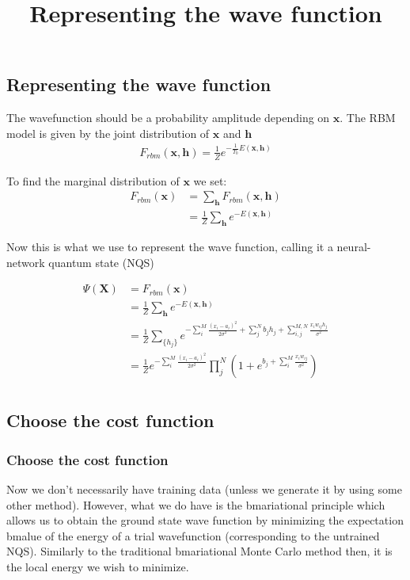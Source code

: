 \documentclass[norsk,a4paper,11pt]{beamer}
\begin{document}
\subsection{Representing the wave function}
\begin{frame}
\title{Representing the wave function}
The wavefunction should be a probability amplitude depending on $\bm{x}$. The RBM model is given by the joint distribution of $\bm{x}$ and $\bm{h}$
\begin{align}
	F_{rbm}(\bm{x},\mathbf{h}) = \frac{1}{Z} e^{-\frac{1}{T_0}E(\bm{x},\mathbf{h})}
\end{align}

To find the marginal distribution of $\bm{x}$ we set:
\begin{align}
	F_{rbm}(\mathbf{x}) &= \sum_\mathbf{h} F_{rbm}(\mathbf{x}, \mathbf{h}) \\
				&= \frac{1}{Z}\sum_\mathbf{h} e^{-E(\mathbf{x}, \mathbf{h})}
\end{align}
\end{frame}

\begin{frame}
Now this is what we use to represent the wave function, calling it a neural-network quantum state (NQS)

\begin{align}
	\Psi (\mathbf{X}) &= F_{rbm}(\mathbf{x}) \\
	&= \frac{1}{Z}\sum_{\bm{h}} e^{-E(\mathbf{x}, \mathbf{h})} \\
	&= \frac{1}{Z} \sum_{\{h_j\}} e^{-\sum_i^M \frac{(x_i - a_i)^2}{2\sigma^2} + \sum_j^N b_j h_j + \sum_{i,j}^{M,N} \frac{x_i w_{ij} h_j}{\sigma^2}} \\
	&= \frac{1}{Z} e^{-\sum_i^M \frac{(x_i - a_i)^2}{2\sigma^2}} \prod_j^N (1 + e^{b_j + \sum_i^M \frac{x_i w_{ij}}{\sigma^2}}) \\
\end{align}
\end{frame}

\subsection{Choose the cost function}
\begin{frame}
\frametitle{Choose the cost function}
Now we don't necessarily have training data (unless we generate it by using some other method). However, what we do have is the bm{a}riational principle which allows us to obtain the ground state wave function by minimizing the expectation bm{a}lue of the energy of a trial wavefunction (corresponding to the untrained NQS). Similarly to the traditional bm{a}riational Monte Carlo method then, it is the local energy we wish to minimize. 
\end{frame}
\end{document}
